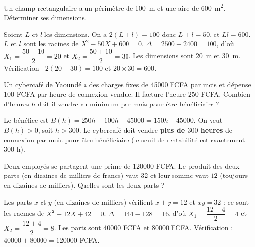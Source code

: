 \documentclass[11pt]{article}
\begin{document}
\begin{exercice}
Un champ rectangulaire a un périmètre de \SI{100}{m} et une aire de \SI{600}{m^2}. Déterminer ses dimensions.
\end{exercice}

\begin{corrige}[Exercice 1]
Soient $L$ et $l$ les dimensions. On a $2(L+l) = 100$ donc $L + l = 50$, et $Ll = 600$. $L$ et $l$ sont les racines de $X^2 - 50X + 600 = 0$. $\Delta = \num{2500} - \num{2400} = 100$, d'où $X_1 = \dfrac{50 - 10}{2} = 20$ et $X_2 = \dfrac{50 + 10}{2} = 30$. Les dimensions sont \SI{20}{m} et \SI{30}{m}. Vérification : $2(20+30) = 100$ et $20 \times 30 = 600$.
\end{corrige}

\begin{exercice}
Un cybercafé de Yaoundé a des charges fixes de \num{45000} FCFA par mois et dépense $100$ FCFA par heure de connexion vendue. Il facture l'heure $250$ FCFA. Combien d'heures $h$ doit-il vendre au minimum par mois pour être bénéficiaire ?
\end{exercice}

\begin{corrige}[Exercice 2]
Le bénéfice est $B(h) = 250h - 100h - \num{45000} = 150h - \num{45000}$. On veut $B(h) > 0$, soit $h > 300$. Le cybercafé doit vendre \textbf{plus de $300$ heures} de connexion par mois pour être bénéficiaire (le seuil de rentabilité est exactement $300$ h).
\end{corrige}

\begin{exercice}
Deux employés se partagent une prime de \num{120000} FCFA. Le produit des deux parts (en dizaines de milliers de francs) vaut $32$ et leur somme vaut $12$ (toujours en dizaines de milliers). Quelles sont les deux parts ?
\end{exercice}

\begin{corrige}[Exercice 3]
Les parts $x$ et $y$ (en dizaines de milliers) vérifient $x + y = 12$ et $xy = 32$ : ce sont les racines de $X^2 - 12X + 32 = 0$. $\Delta = 144 - 128 = 16$, d'où $X_1 = \dfrac{12 - 4}{2} = 4$ et $X_2 = \dfrac{12 + 4}{2} = 8$. Les parts sont \num{40000} FCFA et \num{80000} FCFA. Vérification : $\num{40000} + \num{80000} = \num{120000}$ FCFA.
\end{corrige}
\end{document}
